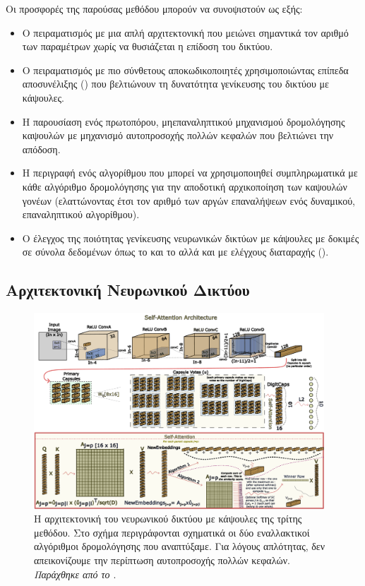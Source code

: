 Οι προσφορές της παρούσας μεθόδου μπορούν να συνοψιστούν ως εξής:
\begin{itemize}
  \item Ο πειραματισμός με μια απλή αρχιτεκτονική που μειώνει σημαντικά τον αριθμό των παραμέτρων χωρίς να θυσιάζεται η επίδοση του δικτύου.
  \item Ο πειραματισμός με πιο σύνθετους αποκωδικοποιητές χρησιμοποιώντας επίπεδα αποσυνέλιξης () που βελτιώνουν τη δυνατότητα γενίκευσης του δικτύου με κάψουλες.
  \item Η παρουσίαση ενός πρωτοπόρου, μη\textendash επαναληπτικού μηχανισμού δρομολόγησης καψουλών με μηχανισμό αυτο\textendash προσοχής πολλών κεφαλών που βελτιώνει την απόδοση.
  \item Η περιγραφή ενός αλγορίθμου που μπορεί να χρησιμοποιηθεί συμπληρωματικά με κάθε αλγόριθμο δρομολόγησης για την αποδοτική αρχικοποίηση των καψουλών γονέων (ελαττώνοντας έτσι τον αριθμό των αργών επαναλήψεων ενός δυναμικού, επαναληπτικού αλγορίθμου).
  \item Ο έλεγχος της ποιότητας γενίκευσης νευρωνικών δικτύων με κάψουλες με δοκιμές σε σύνολα δεδομένων όπως το  και το  αλλά και με ελέγχους διαταραχής ().
\end{itemize}

\subsection{Αρχιτεκτονική Νευρωνικού Δικτύου}

\begin{figure}[h]
  \centering
  \includegraphics[width=0.97\textwidth]{images/chapter method/therd_method_architecture_encoder.pdf}
  \caption{Η αρχιτεκτονική του νευρωνικού δικτύου με κάψουλες της τρίτης μεθόδου. Στο σχήμα περιγράφονται σχηματικά οι δύο εναλλακτικοί αλγόριθμοι δρομολόγησης που αναπτύξαμε. Για λόγους απλότητας, δεν απεικονίζουμε την περίπτωση αυτο\textendash προσοχής πολλών κεφαλών. \textit{Παράχθηκε από το \href{https://inkscape.org/}{}}.}
  \label{fig:method_3_architecture}
\end{figure}

